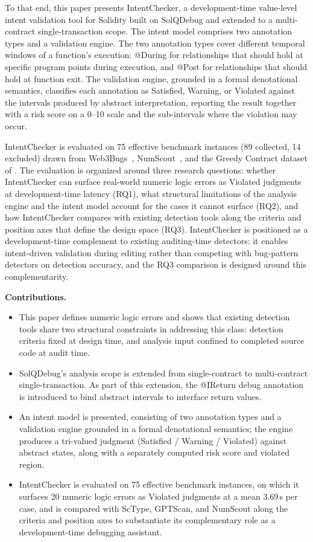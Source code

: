 \documentclass[pdflatex,sn-basic]{sn-jnl}%
\theoremstyle{thmstyleone}%
\theoremstyle{thmstyletwo}%
\theoremstyle{thmstylethree}%
\begin{document}
To that end, this paper presents IntentChecker, a development-time value-level intent validation tool for Solidity built on SolQDebug and extended to a multi-contract single-transaction scope.
The intent model comprises two annotation types and a validation engine. The two annotation types cover different temporal windows of a function's execution: @During for relationships that should hold at specific program points during execution, and @Post for relationships that should hold at function exit. The validation engine, grounded in a formal denotational semantics, classifies each annotation as Satisfied, Warning, or Violated against the intervals produced by abstract interpretation, reporting the result together with a risk score on a 0--10 scale and the sub-intervals where the violation may occur.

IntentChecker is evaluated on 75 effective benchmark instances (89 collected, 14 excluded) drawn from Web3Bugs~\citep{exploitablebugs}, NumScout~\citep{numscout}, and the Greedy Contract dataset of \citet{flyinointment}.
The evaluation is organized around three research questions: whether IntentChecker can surface real-world numeric logic errors as Violated judgments at development-time latency (RQ1), what structural limitations of the analysis engine and the intent model account for the cases it cannot surface (RQ2), and how IntentChecker compares with existing detection tools along the criteria and position axes that define the design space (RQ3).
IntentChecker is positioned as a development-time complement to existing auditing-time detectors: it enables intent-driven validation during editing rather than competing with bug-pattern detectors on detection accuracy, and the RQ3 comparison is designed around this complementarity.

\smallskip
\noindent\textbf{Contributions.}
\begin{itemize}
    \item This paper defines numeric logic errors and shows that existing detection tools share two structural constraints in addressing this class: detection criteria fixed at design time, and analysis input confined to completed source code at audit time.
    \item SolQDebug's analysis scope is extended from single-contract to multi-contract single-transaction. As part of this extension, the @IReturn debug annotation is introduced to bind abstract intervals to interface return values.
    \item An intent model is presented, consisting of two annotation types and a validation engine grounded in a formal denotational semantics; the engine produces a tri-valued judgment (Satisfied / Warning / Violated) against abstract states, along with a separately computed risk score and violated region.
    \item IntentChecker is evaluated on 75 effective benchmark instances, on which it surfaces 20 numeric logic errors as Violated judgments at a mean 3.69\,s per case, and is compared with ScType, GPTScan, and NumScout along the criteria and position axes to substantiate its complementary role as a development-time debugging assistant.
\end{itemize}
\end{document}
